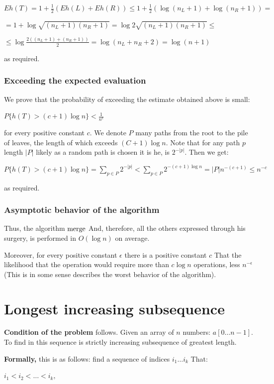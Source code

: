$Eh(T)=1+\frac{1}{2}(Eh(L)+Eh(R))\leq1+\frac{1}{2}(\log(n_{L}+1)+\log(n_{R}+1))=$

$=1+\log\sqrt{(n_{L}+1)(n_{R}+1)}=\log2\sqrt{(n_{L}+1)(n_{R}+1)}\leq$

$\leq\log\frac{2((n_{L}+1)+(n_{R}+1))}{2}=\log(n_{L}+n_{R}+2)=\log(n+1)$

as required.
\subsubsection{ Exceeding the expected evaluation }

We prove that the probability of exceeding the estimate obtained above is small:

$P \{h (T)> (c +1) \log n \} <\frac {1} {n ^ c}$

for every positive constant $c$.
We denote $P$ many paths from the root to the pile of leaves, the length of which exceeds $(C +1) \log n$. Note that for any path $p$ length $| P |$ likely as a random path is chosen it is he, is $2 ^ {- | p |}$. Then we get:

$P\{h(T)>(c+1)\log n\}=\sum_{p\in P}2^{-|p|}<\sum_{p\in P}2^{-(c+1)\log n}=\left|P\right|n^{-(c+1)}\leq n^{-c}$

as required.
\subsubsection{ Asymptotic behavior of the algorithm }

Thus, the algorithm $\rm merge$ And, therefore, all the others expressed through his surgery, is performed in $O (\log n)$ on average.

Moreover, for every positive constant $\epsilon$ there is a positive constant $c$ That the likelihood that the operation would require more than $c \log n$ operations, less $n ^ {- \epsilon}$ (This is in some sense describes the worst behavior of the algorithm).

\section{ Longest increasing subsequence }
\textbf{Condition of the problem} follows. Given an array of $n$ numbers: $a [0 \ldots n-1]$. To find in this sequence is strictly increasing subsequence of greatest length.

\textbf{Formally,} this is as follows: find a sequence of indices $i_1 \ldots i_k$ That:

$i_1 <i_2 <\ldots <i_k,$

